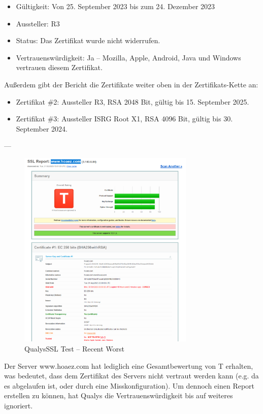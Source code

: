 \documentclass{article}
\begin{document}
\begin{itemize}
    \item Gültigkeit: Von 25. September 2023 bis zum 24. Dezember 2023
    \item Aussteller: R3
    \item Status: Das Zertifikat wurde nicht widerrufen.
    \item Vertrauenswürdigkeit: Ja – Mozilla, Apple, Android, Java und Windows vertrauen diesem Zertifikat.
\end{itemize}

Außerdem gibt der Bericht die Zertifikate weiter oben in der Zertifikats-Kette an:

\begin{itemize}
    \item Zertifikat \#2: Aussteller R3, RSA 2048 Bit, gültig bis 15. September 2025.
    \item Zertifikat \#3: Aussteller ISRG Root X1, RSA 4096 Bit, gültig bis 30. September 2024.
\end{itemize}

\vspace{0.5em}

---

\begin{figure}[H]
	\includegraphics[width=0.75\textwidth]{images/02}
	\centering
	\caption{QualysSSL Test – Recent Worst}
\end{figure}

Der Server www.hoaez.com hat lediglich eine Gesamtbewertung von T erhalten, was bedeutet, dass dem Zertifikat
des Servers nicht vertraut werden kann (e.g. da es abgelaufen ist, oder durch eine Misskonfiguration). Um dennoch einen
Report erstellen zu können, hat Qualys die Vertrauenswürdigkeit bis auf weiteres ignoriert.
\end{document}
